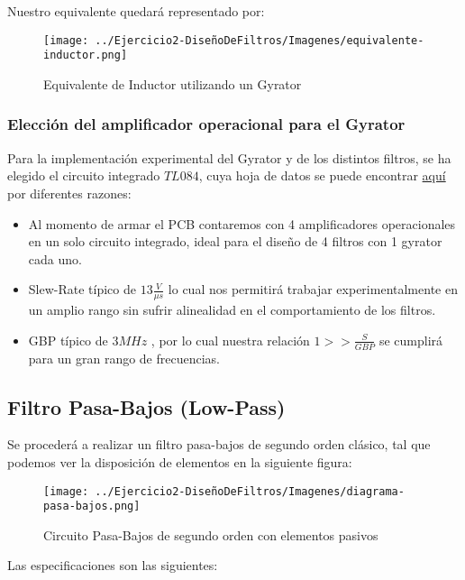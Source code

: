 Nuestro equivalente quedará representado por:

\begin{figure}[H]
    \centering
    \texttt{[image: ../Ejercicio2-DiseñoDeFiltros/Imagenes/equivalente-inductor.png]}
    \caption{Equivalente de Inductor utilizando un Gyrator}
\end{figure}

\subsubsection{Elección del amplificador operacional para el Gyrator}

Para la implementación experimental del Gyrator y de los distintos filtros, 
se ha elegido el circuito integrado $TL084$, cuya hoja de datos se puede encontrar \href{https://www.ti.com/lit/ds/symlink/tl084.pdf?ts=1602260789397&ref_url=https%253A%252F%252Fwww.ti.com%252Fproduct%252FTL084}{aquí} por diferentes razones:

\begin{itemize}
	\item Al momento de armar el PCB contaremos con 4 amplificadores operacionales en un solo circuito integrado, ideal para el diseño de 4 filtros con 1 gyrator cada uno. 
	\item Slew-Rate típico de $13 \frac{V}{\mu s}$ lo cual nos permitirá trabajar experimentalmente en un amplio rango sin sufrir alinealidad en el comportamiento de los filtros.
	\item GBP típico de $3MHz$ , por lo cual nuestra relación $1 >> \frac{S}{GBP}$ se cumplirá para un gran rango de frecuencias.
\end{itemize}

\subsection{Filtro Pasa-Bajos (Low-Pass)}

Se procederá a realizar un filtro pasa-bajos de segundo orden clásico, tal que podemos
ver la disposición de elementos en la siguiente figura:

\begin{figure}[H]
    \centering
    \texttt{[image: ../Ejercicio2-DiseñoDeFiltros/Imagenes/diagrama-pasa-bajos.png]}
    \caption{Circuito Pasa-Bajos de segundo orden con elementos pasivos}
\end{figure}

Las especificaciones son las siguientes:

